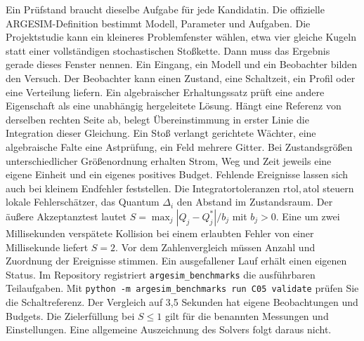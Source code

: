 Ein Prüfstand braucht dieselbe Aufgabe für jede Kandidatin. Die offizielle ARGESIM-Definition bestimmt Modell, Parameter und Aufgaben. Die Projektstudie kann ein kleineres Problemfenster wählen, etwa vier gleiche Kugeln statt einer vollständigen stochastischen Stoßkette. Dann muss das Ergebnis gerade dieses Fenster nennen.
Ein Eingang, ein Modell und ein Beobachter bilden den Versuch. Der Beobachter kann einen Zustand, eine Schaltzeit, ein Profil oder eine Verteilung liefern. Ein algebraischer Erhaltungssatz prüft eine andere Eigenschaft als eine unabhängig hergeleitete Lösung. Hängt eine Referenz von derselben rechten Seite ab, belegt Übereinstimmung in erster Linie die Integration dieser Gleichung.
Ein Stoß verlangt gerichtete Wächter, eine algebraische Falte eine Astprüfung, ein Feld mehrere Gitter. Bei Zustandsgrößen unterschiedlicher Größenordnung erhalten Strom, Weg und Zeit jeweils eine eigene Einheit und ein eigenes positives Budget. Fehlende Ereignisse lassen sich auch bei kleinem Endfehler feststellen.
Die Integratortoleranzen \(\mathrm{rtol},\mathrm{atol}\) steuern lokale Fehlerschätzer, das Quantum \(\Delta_i\) den Abstand im Zustandsraum. Der äußere Akzeptanztest lautet \(S=\max_j |Q_j-Q_j^*|/b_j\) mit \(b_j>0\). Eine um zwei Millisekunden verspätete Kollision bei einem erlaubten Fehler von einer Millisekunde liefert \(S=2\). Vor dem Zahlenvergleich müssen Anzahl und Zuordnung der Ereignisse stimmen. Ein ausgefallener Lauf erhält einen eigenen Status.
Im Repository registriert \texttt{argesim\_benchmarks} die ausführbaren Teilaufgaben. Mit \texttt{python -m argesim\_benchmarks run C05 validate} prüfen Sie die Schaltreferenz. Der Vergleich auf 3,5 Sekunden hat eigene Beobachtungen und Budgets. Die Zielerfüllung bei \(S\le1\) gilt für die benannten Messungen und Einstellungen. Eine allgemeine Auszeichnung des Solvers folgt daraus nicht.
